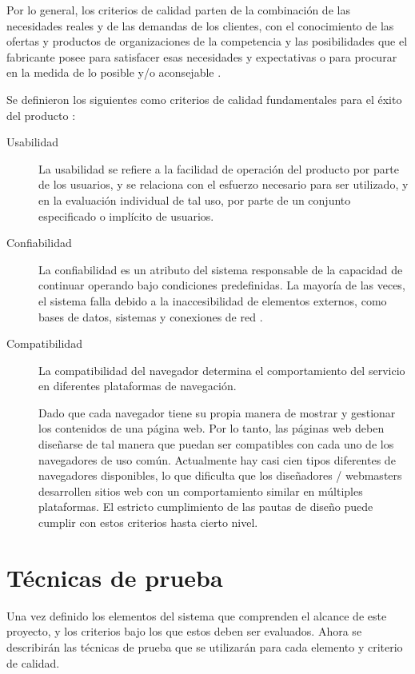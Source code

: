 Por lo general, los criterios de calidad parten de la combinación de las
necesidades reales y de las demandas de los clientes, con el conocimiento de las
ofertas y productos de organizaciones de la competencia y las posibilidades que
el fabricante posee para satisfacer esas necesidades y expectativas o para
procurar en la medida de lo posible y/o aconsejable \cite{Haaz}.

Se definieron los siguientes como criterios de calidad fundamentales para el
éxito del producto \cite{Fillottrani}:

\begin{description}
\item [Usabilidad] La usabilidad se refiere a la facilidad de operación del
producto por parte de los usuarios, y se relaciona con el esfuerzo
necesario para ser utilizado, y en la evaluación individual de tal uso, por
parte de un conjunto especificado o implícito de usuarios.

\item [Confiabilidad] La confiabilidad es un atributo del sistema responsable de
la capacidad de continuar operando bajo condiciones predefinidas. La mayoría de
las veces, el sistema falla debido a la inaccesibilidad de elementos externos,
como bases de datos, sistemas y conexiones de red \cite{Ashanin}.

\item [Compatibilidad] La compatibilidad del navegador determina el
comportamiento del servicio en diferentes plataformas de navegación.

Dado que cada navegador tiene su propia manera de mostrar y gestionar los
contenidos de una página web. Por lo tanto, las páginas web deben diseñarse
de tal manera que puedan ser compatibles con cada uno de los navegadores de uso
común. Actualmente hay casi cien tipos diferentes de navegadores disponibles, lo
que dificulta que los diseñadores / webmasters desarrollen sitios web con un
comportamiento similar en múltiples plataformas. El estricto cumplimiento de las
pautas de diseño puede cumplir con estos criterios hasta cierto nivel.
\end{description}

\section{Técnicas de prueba}
Una vez definido los elementos del sistema que comprenden el alcance de este
proyecto, y los criterios bajo los que estos deben ser evaluados. Ahora se
describirán las técnicas de prueba que se utilizarán para cada elemento y
criterio de calidad.

